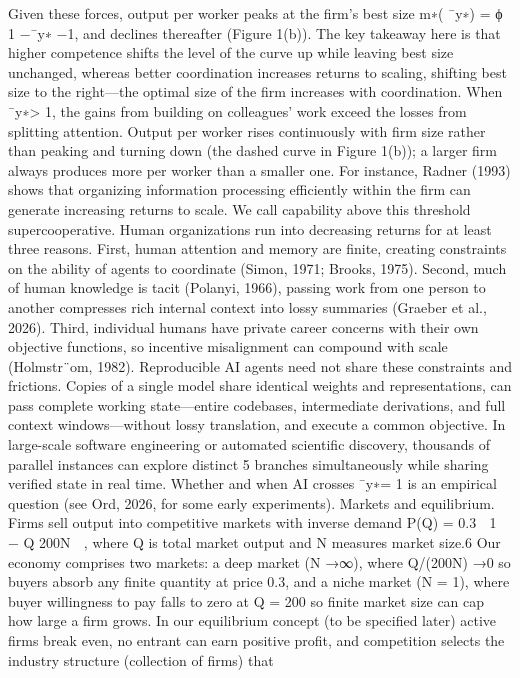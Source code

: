 Given these forces, output per worker peaks at the firm’s best size
m∗( ¯y∗) =
ϕ
1 −¯y∗
−1,
and declines thereafter (Figure 1(b)). The key takeaway here is that higher competence
shifts the level of the curve up while leaving best size unchanged, whereas better
coordination increases returns to scaling, shifting best size to the right—the optimal
size of the firm increases with coordination.
When ¯y∗> 1, the gains from building on colleagues’ work exceed the losses from
splitting attention. Output per worker rises continuously with firm size rather than
peaking and turning down (the dashed curve in Figure 1(b)); a larger firm always
produces more per worker than a smaller one. For instance, Radner (1993) shows that
organizing information processing efficiently within the firm can generate increasing
returns to scale. We call capability above this threshold supercooperative.
Human organizations run into decreasing returns for at least three reasons. First,
human attention and memory are finite, creating constraints on the ability of agents to
coordinate (Simon, 1971; Brooks, 1975). Second, much of human knowledge is tacit
(Polanyi, 1966), passing work from one person to another compresses rich internal
context into lossy summaries (Graeber et al., 2026). Third, individual humans have
private career concerns with their own objective functions, so incentive misalignment
can compound with scale (Holmstr¨om, 1982).
Reproducible AI agents need not share these constraints and frictions. Copies of a
single model share identical weights and representations, can pass complete working
state—entire codebases, intermediate derivations, and full context windows—without
lossy translation, and execute a common objective. In large-scale software engineering
or automated scientific discovery, thousands of parallel instances can explore distinct
5
branches simultaneously while sharing verified state in real time. Whether and when
AI crosses ¯y∗= 1 is an empirical question (see Ord, 2026, for some early experiments).
Markets and equilibrium. Firms sell output into competitive markets with inverse
demand
P(Q) = 0.3

1 −
Q
200N

,
where Q is total market output and N measures market size.6 Our economy comprises
two markets: a deep market (N →∞), where Q/(200N) →0 so buyers absorb any
finite quantity at price 0.3, and a niche market (N = 1), where buyer willingness to pay
falls to zero at Q = 200 so finite market size can cap how large a firm grows. In our
equilibrium concept (to be specified later) active firms break even, no entrant can earn
positive profit, and competition selects the industry structure (collection of firms) that
